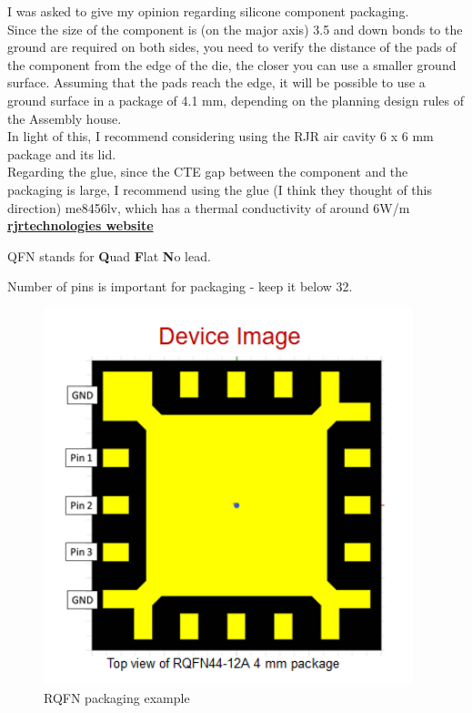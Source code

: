 \documentclass{article}
\begin{document}
\begin{info}
	I was asked to give my opinion regarding silicone component packaging.\\
	Since the size of the component is (on the major axis) 3.5 and down bonds to the ground are required on both sides, you need to verify the distance of the pads of the component from the edge of the die, the closer you can use a smaller ground surface. Assuming that the pads reach the edge, it will be possible to use a ground surface in a package of  4.1 \unit{mm}, depending on the planning design rules of the Assembly house. \\
	In light of this, I recommend considering using the RJR air cavity 6 x 6 \unit{mm} package and its lid. \\
	Regarding the glue, since the CTE gap between the component and the packaging is large, I recommend using the glue (I think they thought of this direction) me8456lv, which has a thermal conductivity of around 6W/m \\
	\href{https://www.rjrtechnologies.com/}{\textbf{rjrtechnologies website}}
\end{info}

QFN stands for \textbf{Q}uad \textbf{F}lat \textbf{N}o lead.

Number of pins is important for packaging - keep it below 32.



\begin{figure}[ht!]
	\centering %
	\includegraphics[width=0.5\linewidth]{Figures/RQFN-4-mm.png}
	\caption{RQFN packaging example }
	\label{fig:rqfn-example}
\end{figure}
\end{document}
